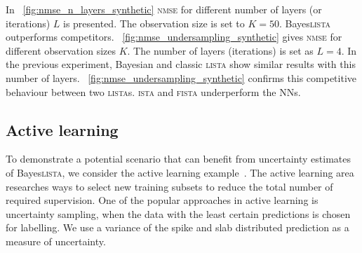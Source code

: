 \documentclass{article}
\begin{document}
  In \figurename~\ref{fig:nmse_n_layers_synthetic} \textsc{nmse} for different number of layers (or iterations) $L$ is presented. The observation size is set to $K=50$. Bayes\textsc{lista} outperforms competitors.
   \figurename~\ref{fig:nmse_undersampling_synthetic} gives \textsc{nmse} for different observation sizes $K$. The number of layers (iterations) is set as $L=4$. In the previous experiment, Bayesian and classic \textsc{lista} show similar results with this number of layers. \figurename~\ref{fig:nmse_undersampling_synthetic} confirms this competitive behaviour between two \textsc{lista}s. \textsc{ista} and \textsc{fista} underperform the NNs. %
  
  \subsection{Active learning}
 To demonstrate a potential scenario that can benefit from uncertainty estimates of Bayes\textsc{lista}, we consider the active learning example~\cite{settles.tr09}. The active learning area researches ways to select new training subsets to reduce the total number of required supervision. One of the popular approaches in active learning is uncertainty sampling, when the data with the least certain predictions is chosen for labelling. We use a variance of the spike and slab distributed prediction as a measure of uncertainty.
  
\end{document}

